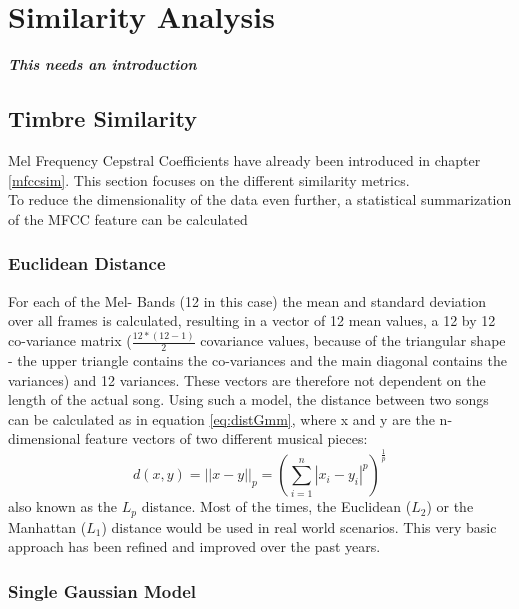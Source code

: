 
\chapter{Similarity Analysis}

\textit{\textbf{This needs an introduction}}

\section{Timbre Similarity} \label{musly}

Mel Frequency Cepstral Coefficients have already been introduced in chapter \ref{mfccsim}. This section focuses on the different similarity metrics.\\
To reduce the dimensionality of the data even further, a statistical summarization of the MFCC feature can be calculated \cite[pp. 51ff]{knees1}\\


\subsection{Euclidean Distance}\label{mfcceuc}

For each of the Mel- Bands (12 in this case) the mean and standard deviation over all frames is calculated, resulting in a vector of 12 mean values, a 12 by 12 co-variance matrix ($\frac{12*(12-1)}{2}$ covariance values, because of the triangular shape - the upper triangle contains the co-variances and the main diagonal contains the variances) and 12 variances. These vectors are therefore not dependent on the length of the actual song. 
Using such a model, the distance between two songs can be calculated as in equation \ref{eq:distGmm}, where x and y are the n-dimensional feature vectors of two different musical pieces:
\begin{equation} \label{eq:distGmm}
d(x, y) = ||x - y||_p = \left(\sum_{i=1}^{n}{|x_i - y_i|^p}\right)^{\frac{1}{p}}
\end{equation}
also known as the $L_p$ distance. Most of the times, the Euclidean ($L_2$) or the Manhattan ($L_1$) distance would be used in real world scenarios. This very basic approach has been refined and improved over the past years. \cite[p. 58]{knees1}

\subsection{Single Gaussian Model}

